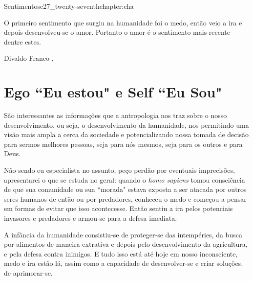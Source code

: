 \begin{chapterpage}{Sentimentos}{c27_twenty-seventhchapter:cha}

\begin{myquotation}O primeiro sentimento que surgiu na humanidade foi o medo, então veio a ira e depois desenvolveu-se o amor. Portanto o amor é o sentimento mais recente dentre estes. 

\par\vspace*{15mm}
\mbox{}\hfill \emdash{}Divaldo Franco 
, %
\par\end{myquotation}

\end{chapterpage}



\section{Ego ``Eu estou" e Self ``Eu Sou"}\label{c1_basicformatting:sec}

\emdash{}São interessantes as informações que a antropologia nos traz sobre o nosso desenvolvimento, ou seja, o desenvolvimento da humanidade, nos permitindo uma visão mais ampla a cerca da sociedade e potencializando nossa tomada de decisão para sermos melhores pessoas, seja para nós mesmos, seja para os outros e para Deus.

\emdash{}Não sendo eu especialista no assunto, peço perdão por eventuais imprecisões, apresentarei o que se estuda no geral: quando o \textit{homo sapiens} tomou consciência de que sua comunidade ou sua ``morada" estava exposta a ser atacada por outros seres humanos de então ou por predadores, conheceu o medo e começou a pensar em formas de evitar que isso acontecesse. Então sentiu a ira pelos potenciais invasores e predadores e armou-se para a defesa imediata.

\emdash{}A infância da humanidade consistiu-se de proteger-se das intempéries, da busca por alimentos de maneira extrativa e depois pelo desenvolvimento da agricultura, e pela defesa contra inimigos. E tudo isso está até hoje em nosso inconsciente, medo e ira estão lá, assim como a capacidade de desenvolver-se e criar soluções, de aprimorar-se.

